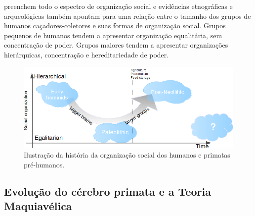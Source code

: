  preenchem todo o espectro de organização social e evidências etnográficas e arqueológicas também apontam para uma relação entre o tamanho dos grupos de humanos caçadores-coletores e suas formas de organização social\cite[-5cm]{Currie2010, Kennett2008}. Grupos pequenos de humanos tendem a apresentar organização equalitária, sem concentração de poder. Grupos maiores tendem a apresentar organizações hierárquicas, concentração e hereditariedade de poder. 
\begin{figure}
	\centering
	\includegraphics[width = 1.05\textwidth]{figuras/ushaped.png}
	\caption{ Ilustração da história da organização social dos humanos e primatas pré-humanos.}
	\label{fig:ushaped}
\end{figure}

\subsection{Evolução do cérebro primata e a Teoria Maquiavélica}

